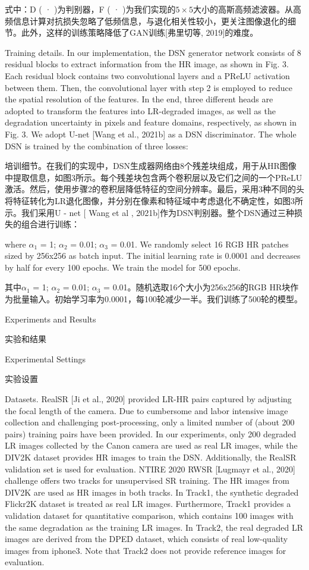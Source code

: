 式中：D ( · )为判别器，F ( · )为我们实现的$5\times5$大小的高斯高频滤波器。从高频信息计算对抗损失忽略了低频信息，与退化相关性较小，更关注图像退化的细节。此外，这样的训练策略降低了GAN训练[弗里切等, 2019]的难度。

Training details. In our implementation, the DSN generator network consists of 8 residual blocks to extract information from the HR image, as shown in Fig. 3. Each residual block contains two convolutional layers and a PReLU activation between them. Then, the convolutional layer with step 2 is employed to reduce the spatial resolution of the features. In the end, three different heads are adopted to transform the features into LR-degraded images, as well as the degradation uncertainty in pixels and feature domains, respectively, as shown in Fig. 3. We adopt U-net [Wang et al., 2021b] as a DSN discriminator. The whole DSN is trained by the combination of three losses:

培训细节。在我们的实现中，DSN生成器网络由8个残差块组成，用于从HR图像中提取信息，如图3所示。每个残差块包含两个卷积层以及它们之间的一个PReLU激活。然后，使用步骤2的卷积层降低特征的空间分辨率。最后，采用3种不同的头将特征转化为LR退化图像，并分别在像素和特征域中考虑退化不确定性，如图3所示。我们采用U - net [ Wang et al , 2021b]作为DSN判别器。整个DSN通过三种损失的组合进行训练：

where $\alpha_1$ = 1; $\alpha_2$ = 0.01; $\alpha_3$ = 0.01. We randomly select 16 RGB HR patches sized by 256x256 as batch input. The initial learning rate is 0.0001 and decreases by half for every 100 epochs. We train the model for 500 epochs.

其中$\alpha_1$ = 1; $\alpha_2$ = 0.01; $\alpha_3$ = 0.01。随机选取16个大小为256x256的RGB HR块作为批量输入。初始学习率为0.0001，每100轮减少一半。我们训练了500轮的模型。



Experiments and Results

实验和结果

Experimental Settings

实验设置

Datasets. RealSR [Ji et al., 2020] provided LR-HR pairs captured by adjusting the focal length of the camera. Due to cumbersome and labor intensive image collection and challenging post-processing, only a limited number of (about 200 pairs) training pairs have been provided. In our experiments, only 200 degraded LR images collected by the Canon camera are used as real LR images, while the DIV2K dataset provides HR images to train the DSN. Additionally, the RealSR validation set is used for evaluation. NTIRE 2020 RWSR [Lugmayr et al., 2020] challenge offers two tracks for unsupervised SR training. The HR images from DIV2K are used as HR images in both tracks. In Track1, the synthetic degraded Flickr2K dataset is treated as real LR images. Furthermore, Track1 provides a validation dataset for quantitative comparison, which contains 100 images with the same degradation as the training LR images. In Track2, the real degraded LR images are derived from the DPED dataset, which consists of real low-quality images from iphone3. Note that Track2 does not provide reference images for evaluation.

